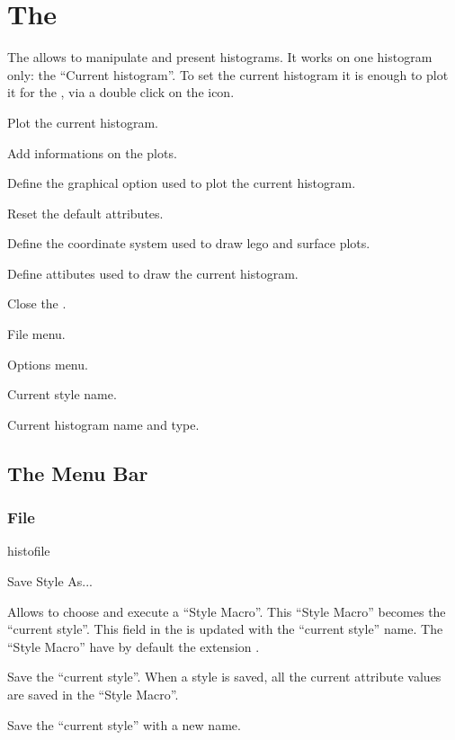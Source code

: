 \section{The \HSP}
The \HSP{} allows to manipulate and present histograms. It works on
one histogram only: the ``Current histogram''. To set the current histogram
it is enough to plot it for the \MB, via a double click on the icon.
\begin{EnumZB}
\item Plot the current histogram.
\item Add informations on the plots.
\item Define the graphical option used to plot the current histogram.
\item Reset the default attributes.
\item Define the coordinate system used to draw lego and surface plots.
\item Define attibutes used to draw the current histogram.
\item Close the \HSP.
\end{EnumZB}
\begin{EnumZW}
\item File menu.
\item Options menu.
\item Current style name.
\item Current histogram name and type.
\end{EnumZW}

\newpage

\subsection{The \HSP{} Menu Bar}


\subsubsection{File}

\begin{PAWf}{histofile}
\begin{DLsf}{Save Style As...} 
\item[Open Style] Allows to choose and execute a ``Style Macro''.
                  This ``Style Macro'' becomes the ``current style''. This
                  field  in the \HSP{} is updated with the 
                  ``current style'' name. The ``Style Macro'' have by default
                  the extension .
\item[Save Style] Save the ``current style''. When a style is saved, all the
                  current attribute values are saved in the ``Style Macro''. 
\item[Save Style As...] Save the ``current style'' with a new name. 
\item[Close] 
\end{DLsf}
\end{PAWf}


